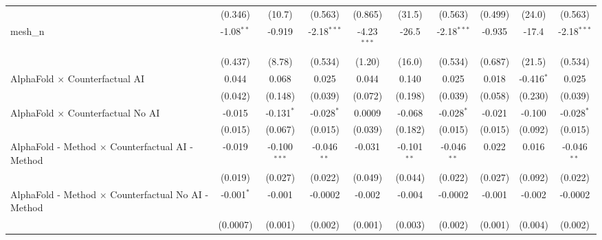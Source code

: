 \begin{tabular}{lccccccccc}
                                                               & (0.346)        & (10.7)         & (0.563)       & (0.865)       & (31.5)         & (0.563)       & (0.499)        & (24.0)        & (0.563)\\   
   mesh\_n                                                     & -1.08$^{**}$   & -0.919         & -2.18$^{***}$ & -4.23$^{***}$ & -26.5          & -2.18$^{***}$ & -0.935         & -17.4         & -2.18$^{***}$\\   
                                                               & (0.437)        & (8.78)         & (0.534)       & (1.20)        & (16.0)         & (0.534)       & (0.687)        & (21.5)        & (0.534)\\   
   AlphaFold $\times$ Counterfactual AI                        & 0.044          & 0.068          & 0.025         & 0.044         & 0.140          & 0.025         & 0.018          & -0.416$^{*}$  & 0.025\\   
                                                               & (0.042)        & (0.148)        & (0.039)       & (0.072)       & (0.198)        & (0.039)       & (0.058)        & (0.230)       & (0.039)\\   
   AlphaFold $\times$ Counterfactual No AI                     & -0.015         & -0.131$^{*}$   & -0.028$^{*}$  & 0.0009        & -0.068         & -0.028$^{*}$  & -0.021         & -0.100        & -0.028$^{*}$\\   
                                                               & (0.015)        & (0.067)        & (0.015)       & (0.039)       & (0.182)        & (0.015)       & (0.015)        & (0.092)       & (0.015)\\   
   AlphaFold - Method $\times$ Counterfactual AI - Method      & -0.019         & -0.100$^{***}$ & -0.046$^{**}$ & -0.031        & -0.101$^{**}$  & -0.046$^{**}$ & 0.022          & 0.016         & -0.046$^{**}$\\   
                                                               & (0.019)        & (0.027)        & (0.022)       & (0.049)       & (0.044)        & (0.022)       & (0.027)        & (0.092)       & (0.022)\\   
   AlphaFold - Method $\times$ Counterfactual No AI - Method   & -0.001$^{*}$   & -0.001         & -0.0002       & -0.002        & -0.004         & -0.0002       & -0.001         & -0.002        & -0.0002\\   
                                                               & (0.0007)       & (0.001)        & (0.002)       & (0.001)       & (0.003)        & (0.002)       & (0.001)        & (0.004)       & (0.002)\\   

\end{tabular}
